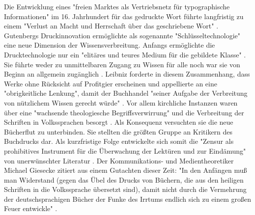 Die Entwicklung eines "freien Marktes als Vertriebsnetz für typographische Informationen"\cite{giesecke_1991_buchdruck} im 16. Jahrhundert für das gedruckte Wort führte langfristig zu einem "Verlust an Macht und Herrschaft über das geschriebene Wort" \cite{wunderlich_2008_buchdruck}. Gutenbergs Druckinnovation ermöglichte als sogenannte "Schlüsseltechnologie" \cite{jager_1993_theoretische} eine neue Dimension der Wissensverbreitung. Anfangs ermöglichte die Drucktechnologie nur ein "elitäres und teures Medium für die gebildete Klasse" \cite{hartmann_2008_medien}. Sie führte weder zu unmittelbaren Zugang zu Wissen für alle noch war sie von Beginn an allgemein zugänglich \cite{hartmann_2008_medien}. Leibniz forderte in diesem Zusammenhang, dass Werke ohne Rücksicht auf Profitgier erscheinen und appellierte an eine "obrigkeitliche Lenkung", damit der Buchhandel "seiner Aufgabe der Verbreitung von nützlichem Wissen gerecht würde" \cite{wittmann_1999_geschichte}. Vor allem kirchliche Instanzen waren über eine "wachsende theologiesche Begriffsverwirrung" und die Verbreitung der Schriften in Volkssprachen besorgt \cite{giesecke_1991_buchdruck}. 
Als Konsequenz versuchten sie die neue Bücherflut zu unterbinden. Sie stellten die größten Gruppe an Kritikern des Buchdrucks dar\cite{giesecke_1991_buchdruck}. Als kurzfristige Folge entwickelte sich somit die "Zensur als prohibitives Instrument für die Überwachung der Lektüren und zur Eindämung" von unerwünschter Literatur \cite{suchen}. Der Kommunikations- und Medientheoretiker Michael Giesecke zitiert aus einem Gutachten dieser Zeit: "In den Anfängen muß man Widerstand (gegen das Übel des Drucks von Büchern, die aus den heiligen Schriften in die Volkssprache übersetzt sind), damit nicht durch die Vermehrung der deutschsprachigen Bücher der Funke des Irrtums endlich sich zu einem großen Feuer entwickle" \cite{giesecke_1991_buchdruck}.

